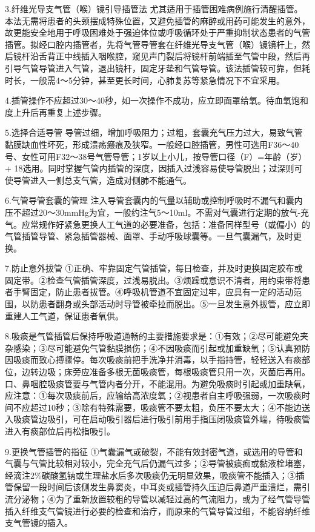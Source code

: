 3.纤维光导支气管（喉）镜引导插管法
尤其适用于插管困难病例施行清醒插管。本法无需将患者的头颈摆成特殊位置，又避免插管的麻醉或用药可能发生的意外，故更能安全地用于呼吸困难处于强迫体位或呼吸循环处于严重抑制状态患者的气管插管。拟经口腔内插管者，先将气管导管套在纤维光导支气管（喉）镜镜杆上，然后镜杆沿舌背正中线插入咽喉腔，窥见声门裂后将镜杆前端插至气管中段，然后再引导气管导管进入气管，退出镜杆，固定牙垫和气管导管。该法插管较可靠，但耗时长，一般需4～5分钟，甚至更长时间，心肺复苏等紧急情况下不宜采用。

4.插管操作不应超过30～40秒，如一次操作不成功，应立即面罩给氧。待血氧饱和度上升后再重复上述步骤。

5.选择合适导管
导管过细，增加呼吸阻力；过粗，套囊充气压力过大，易致气管黏膜缺血性坏死，形成溃疡瘢痕及狭窄。一般经口腔插管，男性可选用F36～40号、女性可用F32～38号气管导管；1岁以上小儿，按导管口径（F）=年龄（岁）+
18选用。同时掌握气管内插管的深度，因插入过浅容易使导管脱出；过深则可使导管进入一侧总支气管，造成对侧肺不能通气。

6.气管导管套囊的管理
注入导管套囊内的气量以辅助或控制呼吸时不漏气和囊内压不超过20～30mmHg为宜，一般约注气5～10ml。不需对气囊进行定期的放气-充气。应常规作好紧急更换人工气道的必要准备，包括：准备同样型号（或偏小）的气管插管导管、紧急插管器械、面罩、手动呼吸球囊等。一旦气囊漏气，及时更换。

7.防止意外拔管
①正确、牢靠固定气管插管，每日检查，并及时更换固定胶布或固定带。②检查气管插管深度，过浅易脱出。③烦躁或意识不清者，用约束带将患者手臂固定，防止患者拔管。④呼吸机管道不宜固定过牢，应具有一定的活动范围，以防患者翻身或头部活动时导管被牵拉而脱出。⑤一旦发生意外拔管，应立即重建人工气道，保证患者氧供。

8.吸痰是气管插管后保持呼吸道通畅的主要措施要求是：①有效；②尽可能避免夹杂感染；③尽可能避免气管黏膜损伤；④不因吸痰而引起或加重缺氧；⑤认真预防因吸痰而致心搏骤停。每次吸痰前把手洗净并消毒，以手指持管，轻轻送入有痰部位，边转边吸；床旁应准备多根无菌吸痰管，每根吸痰管只用一次，灭菌后再用。口、鼻咽腔吸痰管要与气管内者分开，不能混用。为避免吸痰时引起或加重缺氧，应注意：①每次吸痰前后，应输给高浓度氧；②视患者自主呼吸强弱，一次吸痰时间不应超过10秒；③除有特殊需要，吸痰管不要太粗，负压不要太大；④不能边送入吸痰管边吸引，可在启动吸引器后进行吸引前用手指压闭吸痰管外端，待吸痰管进入有痰部位后再松指吸引。

9.更换气管插管的指征
①气囊漏气或破裂，不能有效封密气道，或选用的导管和气囊与气管比较相对较小，完全充气后仍漏气过多；②导管被痰痂或黏液栓堵塞，经滴注2\%碳酸氢钠或生理盐水后多次吸痰仍无明显效果，吸痰管不能插入；③插管保留一段时间后该侧发生鼻窦炎，中耳炎或插管持久压迫后鼻道严重溃烂，需引流分泌物；④为了重新放置较粗的导管以减轻过高的气流阻力，或为了经气管导管插入纤维支气管镜进行必要的检查和治疗，而原来的气管导管过细，不能容纳纤维支气管镜的插入。

